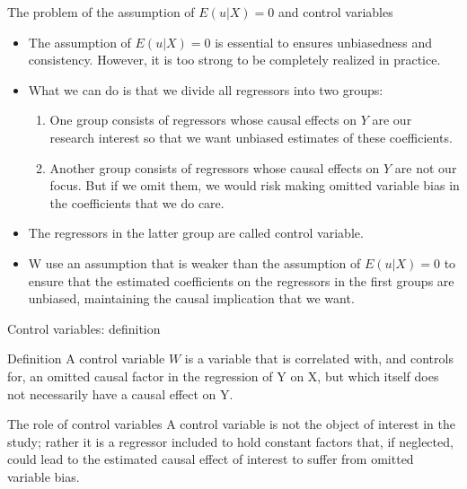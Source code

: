 \documentclass[presentation,10pt]{beamer}
\begin{document}
\begin{frame}[label={sec:org3b6ff70}]{The problem of the assumption of \(E(u|X) = 0\) and control variables}
\begin{itemize}
\item The assumption of \(E(u|X) = 0\) is essential to ensures unbiasedness
and consistency. However, it is too strong to be completely realized
in practice.

\item What we can do is that we divide all regressors into two groups:
\begin{enumerate}
\item One group consists of regressors whose causal effects on \(Y\) are our
research interest so that we want unbiased estimates of these
coefficients.
\item Another group consists of regressors whose causal effects on \(Y\) are
not our focus. But if we omit them, we would risk making omitted
variable bias in the coefficients that we do care.
\end{enumerate}

\item The regressors in the latter group are called \alert{control
variable}.

\item W use an assumption that is weaker than the assumption of
\(E(u|X)=0\) to ensure that the estimated coefficients on the
regressors in the first groups are unbiased, maintaining the causal
implication that we want.
\end{itemize}
\end{frame}

\begin{frame}[label={sec:org1f35056}]{Control variables: definition}
\begin{block}{Definition}
A control variable \(W\) is a variable that is correlated with, and
controls for, an omitted causal factor in the regression of Y on X,
but which itself does not necessarily have a causal effect on Y.
\end{block}

\begin{block}{The role of control variables}
A control variable is not the object of interest in the study; rather
it is a regressor included to hold constant factors that, if
neglected, could lead to the estimated causal effect of interest to
suffer from omitted variable bias.
\end{block}
\end{frame}
\end{document}
